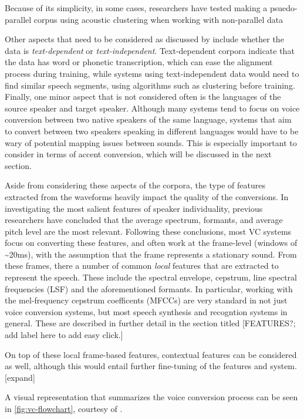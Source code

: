\documentclass
[
    a4paper,
    twoside,
    12pt
]
{report}
\begin{document}
Because of its simplicity, in some cases, researchers have tested making
a psuedo-parallel corpus using acoustic clustering when working with
non-parallel data \parencite{lorenzo-trueba2018, sundermann2006}

Other aspects that need to be considered as discussed by
\textcite{mohammadi2017} include whether the data is
\emph{text-dependent} or \emph{text-independent}. Text-dependent corpora
indicate that the data has word or phonetic transcription, which can
ease the alignment process during training, while systems using
text-independent data would need to find similar speech segments, using
algorithms such as clustering before training. Finally, one minor aspect
that is not considered often is the languages of the source speaker and
target speaker. Although many systems tend to focus on voice conversion
between two native speakers of the same language, systems that aim to
convert between two speakers speaking in different languages would have
to be wary of potential mapping issues between sounds. This is
especially important to consider in terms of accent conversion, which
will be discussed in the next section.

Aside from considering these aspects of the corpora, the type of
features extracted from the waveforms heavily impact the quality of the
conversions. In investigating the most salient features of speaker
individuality, previous researchers have concluded that the average
spectrum, formants, and average pitch level are the most relevant.
Following these conclusions, most VC systems focus on converting these
features, and often work at the frame-level (windows of
\textasciitilde{}20ms), with the assumption that the frame represents a
stationary sound. From these frames, there a number of common
\emph{local} features that are extracted to represent the speech. These
include the spectral envelope, cepstrum, line spectral frequencies (LSF)
and the aforementioned formants. In particular, working with the
mel-frequency cepstrum coefficents (MFCCs) are very standard in not just
voice conversion systems, but most speech synthesis and recogntion
systems in general. These are described in further detail in the section
titled {[}FEATURES?; add label here to add easy click.{]}

On top of these local frame-based features, contextual features can be
considered as well, although this would entail further fine-tuning of
the features and system. {[}expand{]}

A visual representation that summarizes the voice conversion process can
be seen in \autoref{fig:vc-flowchart}, courtesy of
\textcite{mohammadi2017}.
\end{document}

